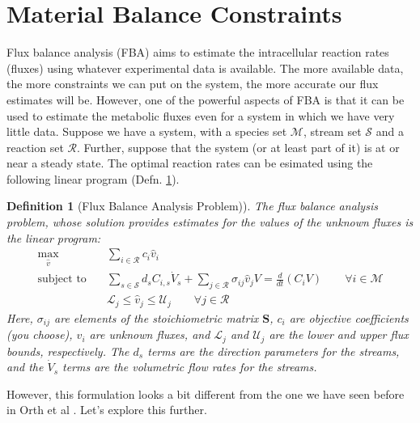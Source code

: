 \documentclass{article}[11pt]
\newtheorem{defn}{Definition}
\begin{document}
\section{Material Balance Constraints}\label{sec-material-balance}
Flux balance analysis (FBA) aims to estimate the intracellular reaction rates (fluxes) using whatever experimental data is available.
The more available data, the more constraints we can put on the system, the more accurate our flux estimates will be.
However, one of the powerful aspects of FBA is that it can be used to estimate the metabolic fluxes even for a system in which we have very little data.
Suppose we have a system, with a species set $\mathcal{M}$, stream set $\mathcal{S}$ and a reaction set $\mathcal{R}$. 
Further, suppose that the system (or at least part of it) is at or near a steady state. 
The optimal reaction rates can be esimated using the following linear program (Defn. \ref{defn-fba-concentration}).
\begin{mdframed}
\begin{defn}[Flux Balance Analysis Problem)]\label{defn-fba-concentration}
The flux balance analysis problem, whose solution provides estimates for the values of the unknown fluxes is the linear program: 
\begin{align*}
\max_{\hat{v}}\quad&  \sum_{i\in\mathcal{R}}c_{i}\hat{v}_{i}\\
\text{subject to}\quad & \sum_{s\in\mathcal{S}}d_{s}C_{i,s}\dot{V}_{s} + \sum_{j\in\mathcal{R}}\sigma_{ij}\hat{v}_{j}V = \frac{d}{dt}\left(C_{i}V\right)\qquad\forall{i\in\mathcal{M}}\\
& \mathcal{L}_{j}\leq\hat{v}_{j}\leq\mathcal{U}_{j}\qquad\forall{j\in\mathcal{R}}
\end{align*}
Here, $\sigma_{ij}$ are elements of the stoichiometric matrix $\mathbf{S}$, $c_{i}$ are objective coefficients (you choose), $\hat{v}_{i}$ are unknown fluxes, and $\mathcal{L}_{j}$ and $\mathcal{U}_{j}$ are the lower and upper flux bounds, respectively.
The $d_{s}$ terms are the direction parameters for the streams, and the $\dot{V}_{s}$ terms are the volumetric flow rates for the streams. 
\end{defn}
\end{mdframed}
However, this formulation looks a bit different from the one we have seen before in Orth et al \cite{Orth:2010aa}.
Let's explore this further.
\end{document}
